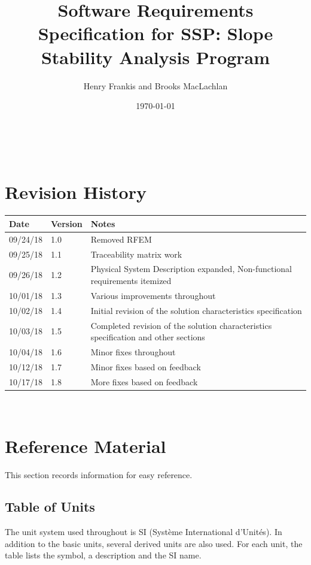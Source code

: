 \documentclass[12pt]{article}
\newcommand{\progname}{SSP}
\begin{document}
\title{Software Requirements Specification for \progname: Slope Stability
  Analysis Program}
\author{Henry Frankis and Brooks MacLachlan}
\date{\today}
	
\maketitle

~\newpage


\section{Revision History}

\begin{tabularx}{\textwidth}{p{3cm}p{2cm}X}
	\toprule {\bf Date} & {\bf Version} & {\bf Notes}\\
	\midrule
	09/24/18 & 1.0 & Removed RFEM\\
	09/25/18 & 1.1 & Traceability matrix work\\
	09/26/18 & 1.2 & Physical System Description expanded, Non-functional 
	requirements itemized\\
	10/01/18 & 1.3 & Various improvements throughout\\
	10/02/18 & 1.4 & Initial revision of the solution characteristics 
	specification\\
	10/03/18 & 1.5 & Completed revision of the solution characteristics 
	specification and other sections\\
	10/04/18 & 1.6 & Minor fixes throughout\\
	10/12/18 & 1.7 & Minor fixes based on feedback\\
	10/17/18 & 1.8 & More fixes based on feedback\\
	\bottomrule
\end{tabularx}

~\newpage

\section{Reference Material} \label{sec_RefMat}
This section records information for easy reference.
\subsection{Table of Units}

The unit system used throughout is SI (Syst\`{e}me International d'Unit\'{e}s). 
In
 addition to the basic units, several derived units are also used. For each 
 unit, the table
 lists the symbol, a description and the SI name.
\newline
\end{document}
